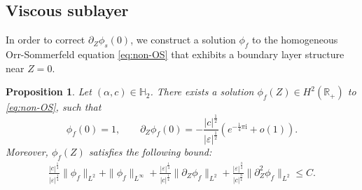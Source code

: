 \documentclass[reqno,11pt]{amsart}
\numberwithin{equation}{section}
\numberwithin{equation}{section}
\theoremstyle{plain}
\newtheorem{proposition}[theorem]{Proposition}
\begin{document}
 \subsection{Viscous sublayer}
In order to correct $\partial_Z\phi_s(0)$, we construct a solution $\phi_{f}$ to the homogeneous Orr-Sommerfeld equation \eqref{eq:non-OS} that exhibits a boundary layer structure near $Z=0.$
\begin{proposition}\label{osf}
	Let $(\alpha,c)\in \mathbb{H}_2$. There exists a solution $\phi_f(Z)\in H^2(\mathbb{R}_+)$ to \eqref{eq:non-OS}, such that
	\begin{equation}
		\phi_f(0)=1,\qquad \partial_Z\phi_f(0)=-\frac{|c|^{\frac12}}{|\varepsilon|^{\frac12}}\left(e^{-\frac{1}{4}\pi \mathrm{i}}+o(1)\right).\label{fast}
\end{equation}
Moreover, $\phi_f(Z)$ satisfies the following bound:
 \begin{align}
 \frac{|c|^{\frac14}}{|\varepsilon|^{\frac14}}\|\phi_{f}\|_{L^2}+\|\phi_f\|_{L^\infty}+\frac{|\varepsilon|^{\frac14}}{|c|^{\frac14}}\|\partial_Z\phi_{f}\|_{L^2}+\frac{|\varepsilon|^{\frac34}}{|c|^{\frac34}}\|\partial_Z^2\phi_{f}\|_{L^2}\leq C.\label{bf}
 \end{align}
\end{proposition}
\end{document}
